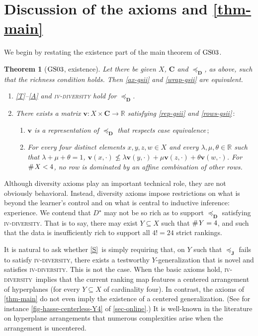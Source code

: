 \documentclass[ecta,nameyear,draft]{econsocart}
\newcommand{\countof}{\mathbin{\#}\hskip1pt}
\newcommand{\R}{\mathbb R}
\newcommand{\preceqb}{\mathbin{\preceq}}
\newcommand{\mbbd}{{\mathbf D}}
\newcommand{\mbbc}{{\mathbf C}}
\newcommand{\mbbj}{\mathbf J}
\newcommand{\past}{{D^\star}}
\newcommand{\stability}{\ref{S}}
\newcommand{\fourdiv}{\textsc{iv}-\textsc{diversity}}
\newcommand{\gsii}{$\textup{GS03}$}
\theoremstyle{plain}
\newtheorem*{theorem*}{Theorem}
\theoremstyle{remark}
\begin{document}
\section{Discussion of the axioms and \cref{thm-main}}\label{sec-discussion}
We begin by restating the existence part of the main theorem of \gsii.
\begin{theorem*}[\gsii, existence]\label{thm-gsii} Let there be given $X$,
  $\mbbc$ and $\preceqb_ \mbbd$, as above, such that the richness condition
  holds. Then \ref{ax-gsii} and \ref{wrap-gsii} are equivalent.
  \begin{enumerate}[label=\textup{(\roman*)}]
    \item\label{ax-gsii} \textup{\ref{T}--\ref{A}} and \textup{\fourdiv} hold
      for $\preceq_{\mbbd}$.
    \item\label{wrap-gsii} There exists a matrix $\mathbf{v} : X \times \mbbc
      \rightarrow \R$ satisfying \ref{rep-gsii} and \ref{rows-gsii}$\,:$
      \begin{enumerate}[label=\textup{(\alph*)}]
        \item\label{rep-gsii} $\mathbf{v}$ is a representation of
          $\preceq_{\mbbd}$ that respects case equivalence$\,;$
        \item\label{rows-gsii} For every four distinct elements $x,y,z,w \in X$
          and every $\lambda , \mu, \theta \in \R$ such that $\lambda +\mu +
          \theta = 1$, $\mathbf{v}(x,\cdot ) \not \leq \lambda
          \mathbf{v}(y,\cdot
          )+\mu
          \mathbf{v}(z,\cdot)+ \theta \mathbf{v}(w,\cdot)$.  For $\countof X <
          4$, no row is dominated by an affine combination of other rows.
      \end{enumerate} 
  \end{enumerate}
\end{theorem*}

Although diversity axioms play an important technical role, they are not
obviously behavioral. Instead, diversity axioms impose restrictions on what is
beyond the learner's control and on what is central to inductive inference:
experience. We contend that $\past$ may not be so rich as to support
$\preceqb_{\mbbd}$ satisfying \fourdiv. That is to say, there may exist $Y
\subseteq X$ such that $\countof Y = 4$, and such that the data is
insufficiently rich to support all $4 ! = 24$ strict rankings.

It is natural to ask whether \stability\ is simply requiring that, on $Y$ such
that $\preceq_{\mbbj}$ fails to satisfy \fourdiv, there exists a testworthy
$Y$-generalization that is novel and satisfies \fourdiv.  This is not the
case.  When the basic axioms hold, \fourdiv\ implies that the current ranking
map features a centered arrangement of hyperplanes (for every $Y\subseteq X$ of
cardinality four). In contrast, the axioms of \cref{thm-main} do not even imply
the existence of a centered generalization.  (See for instance
\cref{fig-hasse-centerless-Y4} of \cref{sec-online}.) It is well-known in the
literature on hyperplane arrangements that numerous complexities arise when the
arrangement is uncentered.
\end{document}
